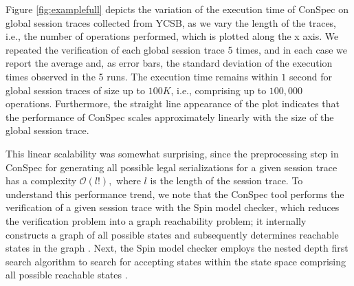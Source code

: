 \documentclass[journal, compsoc]{IEEEtran}
\begin{document}
	
	Figure \ref{fig:examplefull} depicts the variation of the execution time of ConSpec on global session  traces collected from YCSB, as we vary the length of the traces, i.e., the number of operations performed, which is plotted along the x axis. We repeated the verification of each global session trace 5 times,  and in each case we report the average and, as error bars, the standard deviation of the execution times observed in the 5 runs.
	The execution time remains within $1$ second for global session traces of size up to $100K$, i.e., comprising up to $100,000$  operations. Furthermore, the straight line appearance of the plot indicates that the performance of ConSpec scales approximately linearly with the size of the global session trace.
	\par This linear scalability was somewhat surprising, since the preprocessing step in ConSpec for generating all possible legal serializations for a given session trace has a complexity $\mathcal{O}(\mathit{l}!),$ where $\mathit{l}$ is the length of the session trace. To understand this performance trend, we note that the ConSpec tool performs the verification of a given session trace with the  Spin model checker, which reduces the verification problem into a graph reachability problem; it internally constructs a graph of all possible states and subsequently determines  reachable states in the graph \cite{Holzmann:1997:MCS:260897.260902}. Next, the Spin model checker  employs the nested depth first search algorithm \cite{DBLP:conf/dimacs/HolzmannPY96} to search for accepting states within the state space comprising all possible reachable states \cite{DBLP:conf/tacas/SchwoonE05}.
\end{document}
